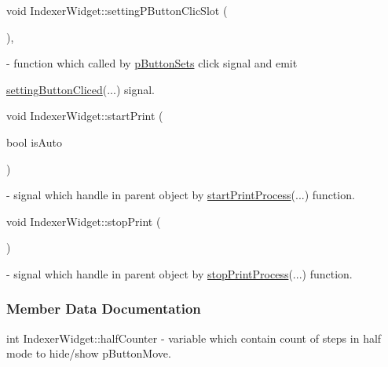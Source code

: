 \mbox{\label{classIndexerWidget_a4621d1eb9163b44c7d5343551e8bb225}} 
{\footnotesize\ttfamily void Indexer\+Widget\+::\texorpdfstring{setting\+P\+Button\+Clic\+Slot}{settingPButtonClicSlot} (\begin{DoxyParamCaption}{ }\end{DoxyParamCaption}){\ttfamily [private]}, {\ttfamily [slot]}} - function which called by \hyperlink{classIndexerWidget_a9f5ddd2008811969c702188992f1a3da}{p\+Button\+Sets} click signal and emit {\hyperlink{classIndexerWidget_a5b786596789da83ff37ad1c8df223d0f}{setting\+Button\+Cliced}(...) signal.

\mbox{\label{classIndexerWidget_a31cbe782d1f10a27c6f80924c8445ae5}} 
{\footnotesize\ttfamily void Indexer\+Widget\+::\texorpdfstring{start\+Print}{startPrint} (\begin{DoxyParamCaption}\item[{bool}]{is\+Auto }\end{DoxyParamCaption}){\ttfamily [signal]}} - signal which handle in parent object by \hyperlink{classMainWindow_a18d83d170a660644bb70fda6b28a2bc6}{start\+Print\+Process}(...) function.

\mbox{\label{classIndexerWidget_a1fff5da56d91020863b52f17a4dc6f49}} 
{\footnotesize\ttfamily void Indexer\+Widget\+::\texorpdfstring{stop\+Print}{stopPrint} (\begin{DoxyParamCaption}{ }\end{DoxyParamCaption}){\ttfamily [signal]}} - signal which handle in parent object by \hyperlink{classMainWindow_a80282fbc6eb85c0f6594975e02a150a3}{stop\+Print\+Process}(...) function.



\subsubsection{Member Data Documentation}
\mbox{\label{classIndexerWidget_a113ecc934dd986f975553c6a55d05523}} 
{\footnotesize\ttfamily int Indexer\+Widget\+::\texorpdfstring{half\+Counter}{halfCounter}{\ttfamily [private]}} - variable which contain count of steps in half mode to hide/\+show p\+Button\+Move.

}
